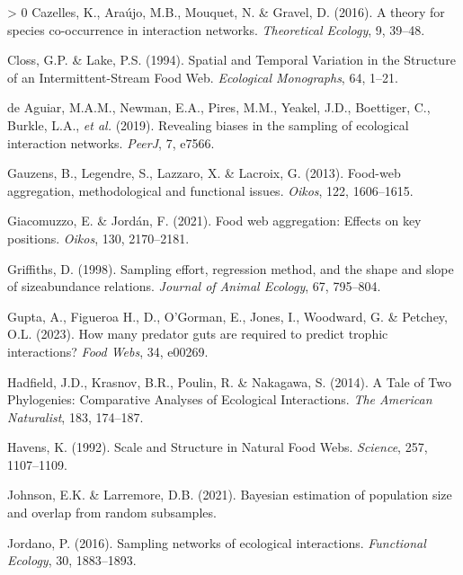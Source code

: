 \documentclass[10pt,oneside]{article}
\newlength{\cslhangindent}
\newenvironment{CSLReferences}[3] %
 {%
  \setlength{\parindent}{0pt}
  \ifodd #1 \everypar{\setlength{\hangindent}{\cslhangindent}}\ignorespaces\fi
  \ifnum #2 > 0
  \setlength{\parskip}{#2\baselineskip}
  \fi
 }%
 {}
\begin{document}
\begin{CSLReferences}{1}{0}
\leavevmode\hypertarget{ref-Cazelles2016TheSpe}{}%
Cazelles, K., Araújo, M.B., Mouquet, N. \& Gravel, D. (2016). A theory
for species co-occurrence in interaction networks. \emph{Theoretical
Ecology}, 9, 39--48.

\leavevmode\hypertarget{ref-Closs1994SpaTem}{}%
Closs, G.P. \& Lake, P.S. (1994). Spatial and Temporal Variation in the
Structure of an Intermittent-Stream Food Web. \emph{Ecological
Monographs}, 64, 1--21.

\leavevmode\hypertarget{ref-deAguiar2019RevBia}{}%
de Aguiar, M.A.M., Newman, E.A., Pires, M.M., Yeakel, J.D., Boettiger,
C., Burkle, L.A., \emph{et al.} (2019). Revealing biases in the sampling
of ecological interaction networks. \emph{PeerJ}, 7, e7566.

\leavevmode\hypertarget{ref-Gauzens2013FooAgg}{}%
Gauzens, B., Legendre, S., Lazzaro, X. \& Lacroix, G. (2013). Food-web
aggregation, methodological and functional issues. \emph{Oikos}, 122,
1606--1615.

\leavevmode\hypertarget{ref-Giacomuzzo2021FooWeb}{}%
Giacomuzzo, E. \& Jordán, F. (2021). Food web aggregation: Effects on
key positions. \emph{Oikos}, 130, 2170--2181.

\leavevmode\hypertarget{ref-Griffiths1998SamEff}{}%
Griffiths, D. (1998). Sampling effort, regression method, and the shape
and slope of sizeabundance relations. \emph{Journal of Animal Ecology},
67, 795--804.

\leavevmode\hypertarget{ref-Gupta2023HowMan}{}%
Gupta, A., Figueroa H., D., O'Gorman, E., Jones, I., Woodward, G. \&
Petchey, O.L. (2023). How many predator guts are required to predict
trophic interactions? \emph{Food Webs}, 34, e00269.

\leavevmode\hypertarget{ref-Hadfield2014TalTwo}{}%
Hadfield, J.D., Krasnov, B.R., Poulin, R. \& Nakagawa, S. (2014). A Tale
of Two Phylogenies: Comparative Analyses of Ecological Interactions.
\emph{The American Naturalist}, 183, 174--187.

\leavevmode\hypertarget{ref-Havens1992ScaStr}{}%
Havens, K. (1992). Scale and Structure in Natural Food Webs.
\emph{Science}, 257, 1107--1109.

\leavevmode\hypertarget{ref-Johnson2021BayEst}{}%
Johnson, E.K. \& Larremore, D.B. (2021). Bayesian estimation of
population size and overlap from random subsamples.

\leavevmode\hypertarget{ref-Jordano2016SamNet}{}%
Jordano, P. (2016). Sampling networks of ecological interactions.
\emph{Functional Ecology}, 30, 1883--1893.


\end{CSLReferences}
\end{document}
